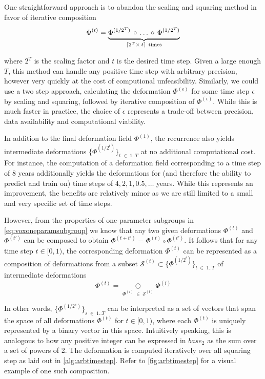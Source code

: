 One straightforward approach is to abandon the scaling and squaring method in favor of iterative composition
\begin{equation}
	\Phi^{(t)} =
	\underbrace{
		\Phi^{(1 / 2^T)} \, \circ \, \ldots \, \circ \, \Phi^{(1 / 2^T)} \vphantom{\Phi^{(1 / 2^T)}_2}
	}_{\lceil 2^T \times \: t \rceil \ \text{times}}
\end{equation}

where $2^T$ is the scaling factor and $t$ is the desired time step. Given a large enough $T$, this method can handle any positive time step with arbitrary precision, however very quickly at the cost of computional unfeasibility. Similarly, we could use a two step approach, calculating the deformation $\Phi^{(\epsilon)}$ for some time step $\epsilon$ by scaling and squaring, followed by iterative composition of $\Phi^{(\epsilon)}$. While this is much faster in practice, the choice of $\epsilon$ represents a trade-off between precision, data availability and computational viability.

In addition to the final deformation field $\Phi^{(1)}$, the recurrence also yields intermediate deformations $\{ \Phi^{(1 / 2^{t})} \}_{t \; \in \; 1 .. T} $ at no additional computational cost. For instance, the computation of a deformation field corresponding to a time step of 8 years additionally yields the deformations for (and therefore the ability to predict and train on) time steps of ${ 4, 2, 1, 0.5, \ldots }$ years. While this represents an improvement, the benefits are relatively minor as we are still limited to a small and very specific set of time steps.

However, from the properties of one-parameter subgroups in \autoref{eq:voxoneparamsubgroup} we know that any two given deformations $\Phi^{(t)}$ and $\Phi^{(t')}$ can be composed to obtain ${ \Phi^{(t + t')} = \Phi^{(t)} \circ \Phi^{(t')} }$. It follows that for any time step $t \in [0, 1)$, the corresponding deformation $\Phi^{(t)}$ can be represented as a composition of deformations from a subset $\mathcal{S}^{(t)} \subset \{ \Phi^{(1 / 2^{t})} \}_{t \; \in \; 1 .. T} $ of intermediate deformations
\begin{equation}
	\Phi^{(t)} = \underset{\Phi^{(i)} \; \in \; \mathcal{S}^{(t)}}{\bigcirc} \Phi^{(i)}
\end{equation}

In other words, $\{ \Phi^{(1 / 2^{s})} \}_{s \; \in \; 1 .. T}$ can be interpreted as a set of vectors that span the space of all deformations $\Phi^{(t)}$ for $t \in [0, 1)$, where each $\Phi^{(t)}$ is uniquely represented by a binary vector in this space. Intuitively speaking, this is analogous to how any positive integer can be expressed in $base_2$ as the sum over a set of powers of 2. The deformation is computed iteratively over all squaring step as laid out in \autoref{alg:arbtimestep}. Refer to \autoref{fig:arbtimestep} for a visual example of one such composition.

